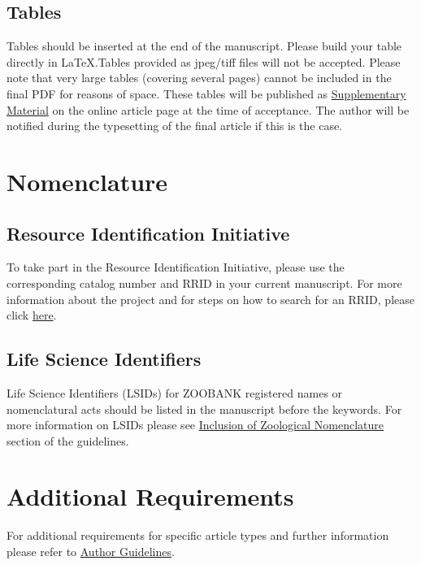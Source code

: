 \documentclass[utf8]{frontiersSCNS} %
\begin{document}
\subsection{Tables}
Tables should be inserted at the end of the manuscript. Please build your table directly in LaTeX.Tables provided as jpeg/tiff files will not be accepted. Please note that very large tables (covering several pages) cannot be included in the final PDF for reasons of space. These tables will be published as \href{http://home.frontiersin.org/about/author-guidelines#SupplementaryMaterial}{Supplementary Material} on the online article page at the time of acceptance. The author will be notified during the typesetting of the final article if this is the case. 

\section{Nomenclature}

\subsection{Resource Identification Initiative}
To take part in the Resource Identification Initiative, please use the corresponding catalog number and RRID in your current manuscript. For more information about the project and for steps on how to search for an RRID, please click \href{http://www.frontiersin.org/files/pdf/letter_to_author.pdf}{here}.

\subsection{Life Science Identifiers}
Life Science Identifiers (LSIDs) for ZOOBANK registered names or nomenclatural acts should be listed in the manuscript before the keywords. For more information on LSIDs please see \href{http://www.frontiersin.org/about/AuthorGuidelines#InclusionofZoologicalNomenclature}{Inclusion of Zoological Nomenclature} section of the guidelines.


\section{Additional Requirements}

For additional requirements for specific article types and further information please refer to \href{http://www.frontiersin.org/about/AuthorGuidelines#AdditionalRequirements}{Author Guidelines}.
\end{document}

